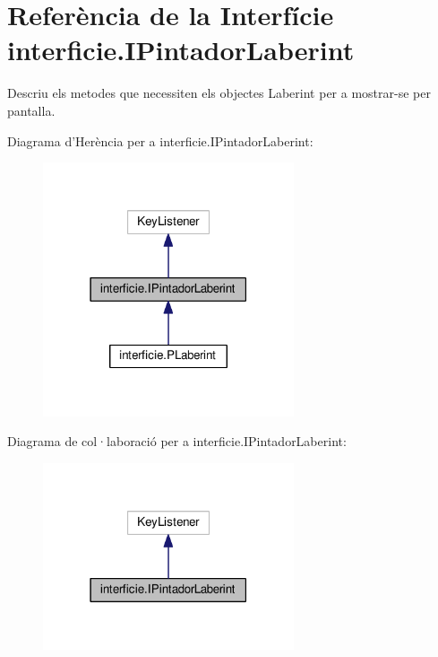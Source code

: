 \hypertarget{interfaceinterficie_1_1_i_pintador_laberint}{\section{Referència de la Interfície interficie.\+I\+Pintador\+Laberint}
\label{interfaceinterficie_1_1_i_pintador_laberint}
}


Descriu els metodes que necessiten els objectes Laberint per a mostrar-\/se per pantalla.  




Diagrama d'Herència per a interficie.\+I\+Pintador\+Laberint\+:
\nopagebreak
\begin{figure}[H]
\begin{center}
\leavevmode
\includegraphics[width=210pt]{interfaceinterficie_1_1_i_pintador_laberint__inherit__graph}
\end{center}
\end{figure}


Diagrama de col·laboració per a interficie.\+I\+Pintador\+Laberint\+:
\nopagebreak
\begin{figure}[H]
\begin{center}
\leavevmode
\includegraphics[width=210pt]{interfaceinterficie_1_1_i_pintador_laberint__coll__graph}
\end{center}
\end{figure}
